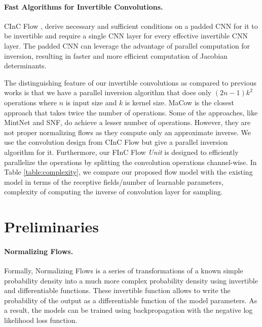 \documentclass[a4paper,twoside]{article}
\theoremstyle{definition}
\begin{document}
\paragraph{Fast Algorithms for Invertible Convolutions.}
CInC Flow \citep{nagar2021cinc}, derive necessary and sufficient conditions on a padded CNN for it to be invertible and require a single CNN layer for every effective invertible CNN layer. The padded CNN can leverage the advantage of parallel computation for inversion, resulting in faster and more efficient computation of Jacobian determinants.

The distinguishing feature of our invertible convolutions as compared to previous works is that we have a parallel inversion algorithm that does only $(2n-1)k^2$ operations where $n$ is input size and $k$ is kernel size. MaCow is the closest approach that takes twice the number of operations. Some of the approaches, like MintNet and SNF, do achieve a lesser number of operations. However, they are not proper normalizing flows as they compute only an approximate inverse. We use the convolution design from CInC Flow but give a parallel inversion algorithm for it. Furthermore, our FInC Flow \emph{Unit} is designed to efficiently parallelize the operations by splitting the convolution operations channel-wise. In Table \ref{table:complexity}, we compare our proposed flow model with the existing model in terms of the receptive fields/number of learnable parameters, complexity of computing the inverse of convolution layer for sampling.











%
 \section{Preliminaries}\label{sec:FastFlow}
\paragraph{Normalizing Flows.}
Formally, Normalizing Flows is a series of transformations of a known simple probability density into a much more complex probability density  using invertible and differentiable functions. These invertible function allows to write the probability of the output as a differentiable function of the model parameters. As a result, the models can be trained using backpropagation with the negative log likelihood loss function.
\end{document}
